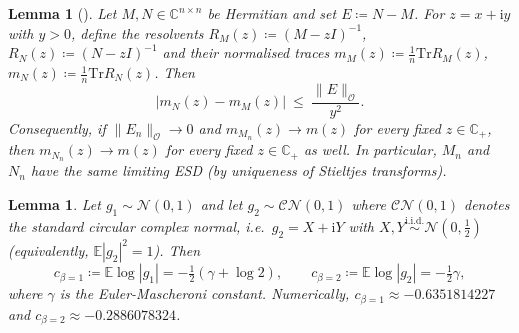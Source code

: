 \documentclass[11pt,a4paper]{article}
\newtheorem{lemma}[theorem]{Lemma}
\newcommand{\op}{\mathcal{O}}
\begin{document}
\begin{lemma}[{\cite{BordenaveRMTNotes2019}}]\label{lem:esd-continuity}
Let $M,N\in\mathbb{C}^{n\times n}$ be Hermitian and set $E\coloneq N-M$. For $z=x+\mathrm{i}y$ with $y>0$, define the resolvents $R_M(z)\coloneq (M-zI)^{-1}$, $R_N(z)\coloneq (N-zI)^{-1}$ and their normalised traces $m_M(z)\coloneq \frac1n\mathrm{Tr} R_M(z)$, $m_N(z)\coloneq \frac1n\mathrm{Tr} R_N(z)$. Then
\begin{equation}\label{eq:resolvent-bound}
|m_N(z)-m_M(z)|\ \le\ \frac{\|E\|_{\op}}{y^2}.
\end{equation}
Consequently, if $\|E_n\|_{\op}\to 0$ and $m_{M_n}(z)\to m(z)$ for every fixed $z\in\mathbb{C}_+$, then $m_{N_n}(z)\to m(z)$ for every fixed $z\in\mathbb{C}_+$ as well. In particular, $M_n$ and $N_n$ have the same limiting ESD (by uniqueness of Stieltjes transforms).
\end{lemma}
\begin{lemma}\label{lem:log-constants}
Let $g_1\sim \mathcal N(0,1)$ and let $g_2\sim \mathcal{CN}(0,1)$ where $\mathcal{CN}(0,1)$ denotes the standard circular complex normal, i.e.\ $g_2=X+\mathrm{i}Y$ with $X,Y\overset{\mathrm{i.i.d.}}{\sim}\mathcal N(0,\tfrac12)$ (equivalently, $\mathbb E|g_2|^2=1$). Then
\begin{equation}
c_{\beta=1}\coloneq \mathbb E\log|g_1|=-\tfrac12(\gamma+\log 2),
\qquad
c_{\beta=2}\coloneq \mathbb E\log|g_2|=-\tfrac12\gamma,
\end{equation}
where $\gamma$ is the Euler-Mascheroni constant. Numerically, $c_{\beta=1}\approx -0.6351814227$ and $c_{\beta=2}\approx -0.2886078324$.
\end{lemma}
\end{document}
